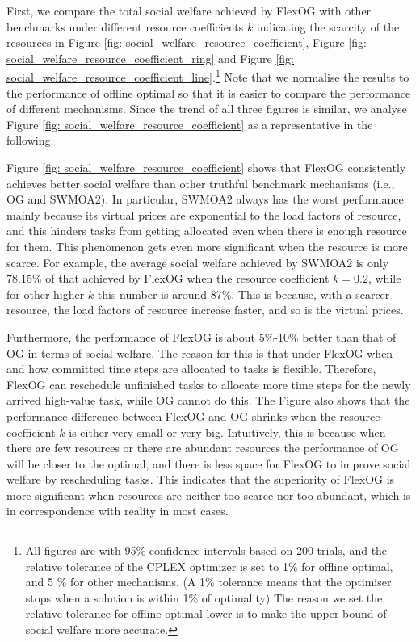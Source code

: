 \documentclass[11pt]{phdthesis}
\begin{document}
First, we compare the total social welfare achieved by FlexOG with other benchmarks under different resource coefficients $ k $ indicating the scarcity of the resources in Figure \ref{fig: social_welfare_resource_coefficient}, Figure \ref{fig: social_welfare_resource_coefficient_ring} and Figure \ref{fig: social_welfare_resource_coefficient_line}.\footnote{All figures are with 95\% confidence intervals based on 200 trials, and the relative tolerance of the CPLEX optimizer is set to 1\% for offline optimal, and 5 \% for other mechanisms. (A 1\% tolerance means that the optimiser stops when a solution is within 1\% of optimality) The reason we set the relative tolerance for offline optimal lower is to make the upper bound of social welfare more accurate.} Note that we normalise the results to the performance of offline optimal so that it is easier to compare the performance of different mechanisms. Since the trend of all three figures is similar, we analyse Figure \ref{fig: social_welfare_resource_coefficient} as a representative in the following. 

Figure \ref{fig: social_welfare_resource_coefficient} shows that FlexOG consistently achieves better social welfare than other truthful benchmark mechanisms (i.e., OG and SWMOA2). In particular, SWMOA2 always has the worst performance mainly because its virtual prices are exponential to the load factors of resource, and this hinders tasks from getting allocated even when there is enough resource for them. This phenomenon gets even more significant when the resource is more scarce. For example, the average social welfare achieved by SWMOA2 is only 78.15\% of that achieved by FlexOG when the resource coefficient $ k = 0.2 $, while for other higher $ k $ this number is around 87\%. This is because, with a scarcer resource, the load factors of resource increase faster, and so is the virtual prices.

Furthermore, the performance of FlexOG is about 5\%-10\% better than that of OG in terms of social welfare. The reason for this is that under FlexOG when and how committed time steps are allocated to tasks is flexible. Therefore, FlexOG can reschedule unfinished tasks to allocate more time steps for the newly arrived high-value task, while OG cannot do this. The Figure also shows that the performance difference between FlexOG and OG shrinks when the resource coefficient $ k $ is either very small or very big. Intuitively, this is because when there are few resources or there are abundant resources the performance of OG will be closer to the optimal, and there is less space for FlexOG to improve social welfare by rescheduling tasks. This indicates that the superiority of FlexOG is more significant when resources are neither too scarce nor too abundant, which is in correspondence with reality in most cases.
\end{document}
